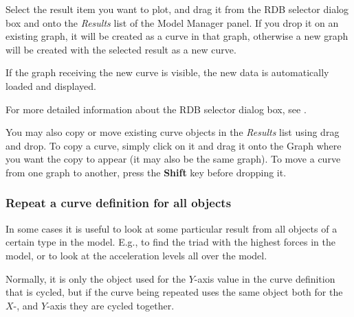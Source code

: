 Select the result item you want to plot, and drag it from the RDB selector
dialog box and onto the {\sl Results} list of the Model Manager panel. If you
drop it on an existing graph, it will be created as a curve in that graph,
otherwise a new graph will be created with the selected result as a new curve.

If the graph receiving the new curve \newline is visible,
the new data is automatically \newline loaded and displayed.

For more detailed information about the RDB selector dialog box, see
.

You may also copy or move existing curve objects in the {\sl Results} list
using drag and drop. To copy a curve, simply click on it and drag it onto the
Graph where you want the copy to appear (it may also be the same graph).
To move a curve from one graph to another, press the \textbf{Shift} key before
dropping it.

\subsubsection{Repeat a curve definition for all objects}

In some cases it is useful to look at some particular result from all objects
of a certain type in the model. E.g., to find the triad with the highest forces
in the model, or to look at the acceleration levels all over the model.


Normally, it is only the object used for the $Y$-axis value in the curve
definition that is cycled, but if the curve being repeated uses the same object
both for the $X$-, and $Y$-axis they are cycled together.

